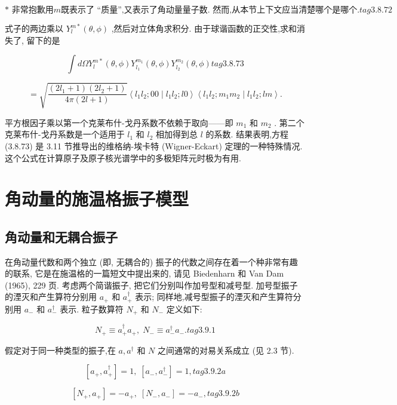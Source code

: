$$
\text{* 非常抱歉用}m\text{既表示了 “质量”,又表示了角动量量子数. 然而,从本节上下文应当清楚哪个是哪个.} tag{3.8.72}
$$

式子的两边乘以 ${Y}_{l}^{m * }\left( {\theta ,\phi }\right)$ ,然后对立体角求积分. 由于球谐函数的正交性,求和消失了, 留下的是

$$
\int {d\Omega }{Y}_{l}^{m * }\left( {\theta ,\phi }\right) {Y}_{{l}_{1}}^{{m}_{1}}\left( {\theta ,\phi }\right) {Y}_{{l}_{2}}^{{m}_{2}}\left( {\theta ,\phi }\right) tag{3.8.73}
$$

$$
= \sqrt{\frac{\left( {2{l}_{1} + 1}\right) \left( {2{l}_{2} + 1}\right) }{{4\pi }\left( {{2l} + 1}\right) }}\left\langle {{l}_{1}{l}_{2};{00} \mid {l}_{1}{l}_{2};{l0}}\right\rangle \left\langle {{l}_{1}{l}_{2};{m}_{1}{m}_{2} \mid {l}_{1}{l}_{2};{lm}}\right\rangle .
$$

平方根因子乘以第一个克莱布什-戈丹系数不依赖于取向——即 ${m}_{1}$ 和 ${m}_{2}$ . 第二个克莱布什-戈丹系数是一个适用于 ${l}_{1}$ 和 ${l}_{2}$ 相加得到总 $l$ 的系数. 结果表明,方程 (3.8.73) 是 3.11 节推导出的维格纳-埃卡特 (Wigner-Eckart) 定理的一种特殊情况. 这个公式在计算原子及原子核光谱学中的多极矩阵元时极为有用.

\section{角动量的施温格振子模型}
\subsection{角动量和无耦合振子}

在角动量代数和两个独立 (即, 无耦合的) 振子的代数之间存在着一个种非常有趣的联系, 它是在施温格的一篇短文中提出来的, 请见 Biedenharn 和 Van Dam (1965), 229 页. 考虑两个简谐振子, 把它们分别叫作加号型和减号型. 加号型振子的湮灭和产生算符分别用 ${a}_{ + }$ 和 ${a}_{ + }^{ \dagger }$ 表示; 同样地,减号型振子的湮灭和产生算符分别用 ${a}_{ - }$ 和 ${a}_{ - }^{ \dagger }$ 表示. 粒子数算符 ${N}_{ + }$ 和 ${N}_{ - }$ 定义如下:

$$
{N}_{ + } \equiv {a}_{ + }^{ \dagger }{a}_{ + },\;{N}_{ - } \equiv {a}_{ - }^{ \dagger }{a}_{ - }. tag{3.9.1}
$$

假定对于同一种类型的振子,在 $a,{a}^{ \dagger }$ 和 $N$ 之间通常的对易关系成立 (见 2.3 节).

$$
\left\lbrack {{a}_{ + },{a}_{ + }^{ \dagger }}\right\rbrack = 1,\;\left\lbrack {{a}_{ - },{a}_{ - }^{ \dagger }}\right\rbrack = 1, tag{3.9.2a}
$$

$$
\left\lbrack {{N}_{ + },{a}_{ + }}\right\rbrack = - {a}_{ + },\;\left\lbrack {{N}_{ - },{a}_{ - }}\right\rbrack = - {a}_{ - }, tag{3.9.2b}
$$


